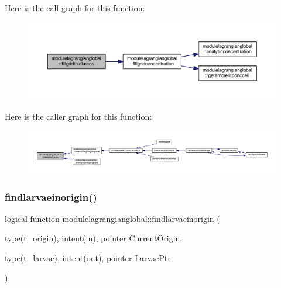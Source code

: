 Here is the call graph for this function\+:\nopagebreak
\begin{figure}[H]
\begin{center}
\leavevmode
\includegraphics[width=350pt]{namespacemodulelagrangianglobal_a36b19f9334aaf4289e0ec7ea7eea643c_cgraph}
\end{center}
\end{figure}
Here is the caller graph for this function\+:\nopagebreak
\begin{figure}[H]
\begin{center}
\leavevmode
\includegraphics[width=350pt]{namespacemodulelagrangianglobal_a36b19f9334aaf4289e0ec7ea7eea643c_icgraph}
\end{center}
\end{figure}
\mbox{\label{namespacemodulelagrangianglobal_a0358a516f0009b4fbeb3513332511d63}} 
\subsubsection{\texorpdfstring{findlarvaeinorigin()}{findlarvaeinorigin()}}
{\footnotesize\ttfamily logical function modulelagrangianglobal\+::findlarvaeinorigin (\begin{DoxyParamCaption}\item[{type(\mbox{\hyperlink{structmodulelagrangianglobal_1_1t__origin}{t\+\_\+origin}}), intent(in), pointer}]{Current\+Origin,  }\item[{type(\mbox{\hyperlink{structmodulelagrangianglobal_1_1t__larvae}{t\+\_\+larvae}}), intent(out), pointer}]{Larvae\+Ptr }\end{DoxyParamCaption})\hspace{0.3cm}{\ttfamily [private]}}


